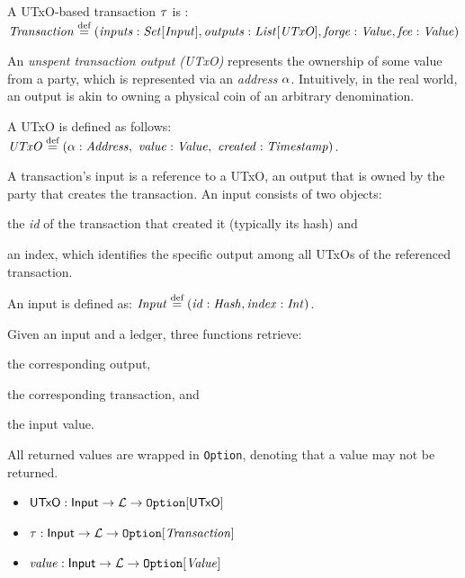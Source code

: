 \begin{definition}
    A UTxO-based transaction $\tau$ is :
    $\mathit{Transaction} \stackrel{\textrm{\scriptsize def}}{=} (\mathit{inputs}: \mathit{Set}[\mathit{Input}],
                       \mathit{outputs}: \mathit{List}[\mathit{UTxO}],
                       \mathit{forge}: \mathit{Value},
                       \mathit{fee}: \mathit{Value})$
\end{definition}

An \emph{unspent transaction output (UTxO)} represents the ownership of some
value from a party, which is represented via an \emph{address} $\alpha$.
Intuitively, in the real world, an output is akin to owning a physical coin of
an arbitrary denomination.

\begin{definition}\label{def:utxo}
    A UTxO is defined as follows: $\mathit{UTxO} \stackrel{\textrm{\scriptsize def}}{=} (\alpha: \mathit{Address},\ \mathit{value}: \mathit{Value},\ \mathit{created}: \mathit{Timestamp})$.
\end{definition}

A transaction's input is a reference to a UTxO, \ie an output that is owned by
the party that creates the transaction. An input consists of two objects:
\begin{inparaenum}[i)]
    \item the \emph{id} of the transaction that created it (typically its hash)
        and
    \item an index, which identifies the specific output among all UTxOs of the
        referenced transaction.
\end{inparaenum}

\begin{definition}
    An input is defined as: $\mathit{Input} \stackrel{\textrm{\scriptsize def}}{=} (\mathit{id}: \mathit{Hash}, \mathit{index}: \mathit{Int})$.
\end{definition}

Given an input and a ledger, three functions retrieve:
\begin{inparaenum}[i)]
    \item the corresponding output,
    \item the corresponding transaction, and
    \item the input value.
\end{inparaenum}
All returned values are wrapped in \verb|Option|, denoting that a value may not
be returned.

\begin{itemize}
    \item $\utxo: \inp \rightarrow \ledger \rightarrow \verb|Option|[\utxo]$
    \item $\tx: \inp \rightarrow \ledger \rightarrow
        \verb|Option|[\mathit{Transaction}]$
    \item $\mathit{value}: \inp \rightarrow \ledger \rightarrow \verb|Option|[\mathit{Value}]$
\end{itemize}

